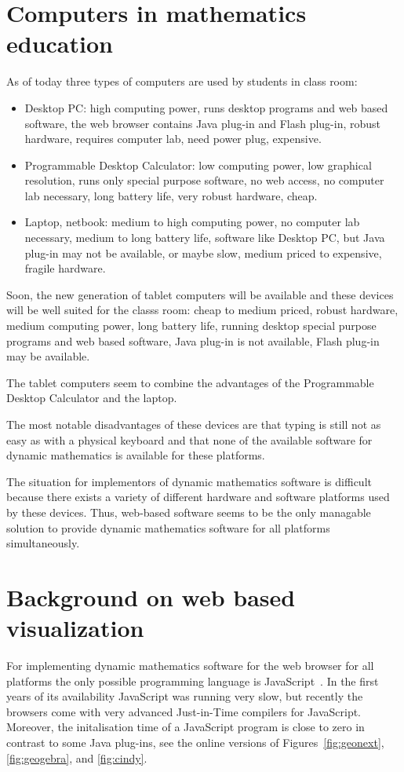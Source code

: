 \documentclass[12pt,a4paper]{article}%
\begin{document}
\section{Computers in mathematics education}
As of today three types of computers are used by students in class room:
\begin{itemize}
\item Desktop PC: high computing power, runs desktop programs and web based software, 
the web browser contains Java plug-in and Flash plug-in, robust hardware,
requires computer lab, need power plug, expensive.
\item Programmable Desktop Calculator: low computing power, low graphical resolution, runs only
special purpose software, no web access, no computer lab necessary, long battery life, 
very robust hardware, cheap.
\item Laptop, netbook: medium to high computing power, no computer lab necessary, 
medium to long battery life, software like Desktop PC, but Java plug-in may not be available, or maybe slow,
medium priced to expensive, fragile hardware.
\end{itemize}
Soon, the new generation of tablet computers will be available and these devices will be
well suited for the classs room: cheap to medium priced, robust hardware, medium
computing power, long battery life, running desktop special purpose programs and web based software,
Java plug-in is not available, Flash plug-in may be available.

The tablet computers seem to combine the advantages of the Programmable Desktop Calculator 
and the laptop. 

The most notable disadvantages of these devices are that typing is still not as easy 
as with a physical keyboard and that none of the available software for 
dynamic mathematics is available for these platforms.

The situation for implementors of dynamic mathematics software is difficult because there exists a variety
of different hardware and software platforms used by these devices. Thus, 
web-based software seems to be the only managable solution to provide 
dynamic mathematics software for all platforms simultaneously.

\section{Background on web based visualization}\label{sec:3}
For implementing dynamic mathematics software for the web browser for all platforms 
the only possible programming language is JavaScript~\cite{crockford}. In the first years of its availability
JavaScript was running very slow, but recently the browsers come with very advanced
Just-in-Time compilers for JavaScript. Moreover, the initalisation time of a 
JavaScript program is close to zero in contrast to some Java plug-ins, see the online versions of
Figures~\ref{fig:geonext}, \ref{fig:geogebra}, and \ref{fig:cindy}.
\end{document}
